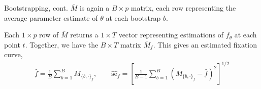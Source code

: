 \documentclass{beamer}
\begin{document}
\begin{frame}{Bootstrapping, cont.}
$\overline{M}$ is again a $B \times p$ matrix, each row  representing the average parameter estimate of $\theta$ at each bootstrap $b$. \newline 

Each $1\times p$ row of $\overline{M}$ returns a $1 \times T$ vector representing estimations of $f_{\theta}$ at each point $t$. Together, we have the $B \times T$ matrix $\overline{M}_f$. This gives an estimated fixation curve, 
\begin{align*}
\hat{f} = \frac1B \sum_{b=1}^B \overline{M}_{\{b, \cdot\}_f}, \qquad \widehat{\text{se}}_{f} = \left[ \frac{1}{B-1} \sum_{b=1}^B \left( \overline{M}_{\{b, \cdot\}_{f}} - \hat{f} \right)^2 \right]^{1/2} 
\end{align*}
\end{frame}
\end{document}
